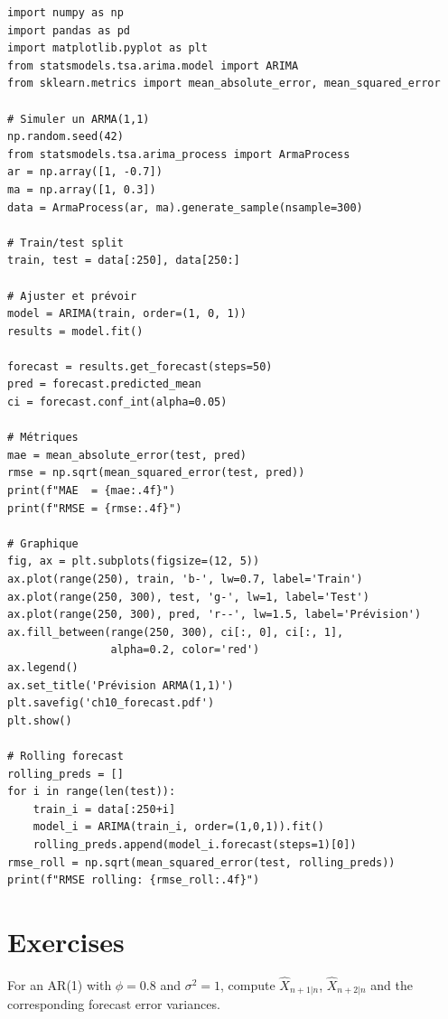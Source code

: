 \begin{codeblock}[title=\textbf{Python}]
\begin{verbatim}
import numpy as np
import pandas as pd
import matplotlib.pyplot as plt
from statsmodels.tsa.arima.model import ARIMA
from sklearn.metrics import mean_absolute_error, mean_squared_error

# Simuler un ARMA(1,1)
np.random.seed(42)
from statsmodels.tsa.arima_process import ArmaProcess
ar = np.array([1, -0.7])
ma = np.array([1, 0.3])
data = ArmaProcess(ar, ma).generate_sample(nsample=300)

# Train/test split
train, test = data[:250], data[250:]

# Ajuster et prévoir
model = ARIMA(train, order=(1, 0, 1))
results = model.fit()

forecast = results.get_forecast(steps=50)
pred = forecast.predicted_mean
ci = forecast.conf_int(alpha=0.05)

# Métriques
mae = mean_absolute_error(test, pred)
rmse = np.sqrt(mean_squared_error(test, pred))
print(f"MAE  = {mae:.4f}")
print(f"RMSE = {rmse:.4f}")

# Graphique
fig, ax = plt.subplots(figsize=(12, 5))
ax.plot(range(250), train, 'b-', lw=0.7, label='Train')
ax.plot(range(250, 300), test, 'g-', lw=1, label='Test')
ax.plot(range(250, 300), pred, 'r--', lw=1.5, label='Prévision')
ax.fill_between(range(250, 300), ci[:, 0], ci[:, 1],
                alpha=0.2, color='red')
ax.legend()
ax.set_title('Prévision ARMA(1,1)')
plt.savefig('ch10_forecast.pdf')
plt.show()

# Rolling forecast
rolling_preds = []
for i in range(len(test)):
    train_i = data[:250+i]
    model_i = ARIMA(train_i, order=(1,0,1)).fit()
    rolling_preds.append(model_i.forecast(steps=1)[0])
rmse_roll = np.sqrt(mean_squared_error(test, rolling_preds))
print(f"RMSE rolling: {rmse_roll:.4f}")
\end{verbatim}
\end{codeblock}

\section{Exercises}

\begin{exercise}[$\star$]
For an AR(1) with $\phi=0.8$ and $\sigma^2=1$, compute $\hat{X}_{n+1|n}$, $\hat{X}_{n+2|n}$ and the corresponding forecast error variances.
\end{exercise}

